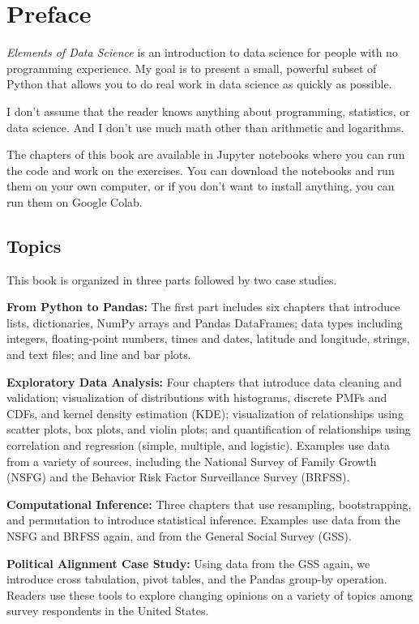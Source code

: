 \hypertarget{preface}{%
\chapter{Preface}\label{preface}}

\emph{Elements of Data Science} is an introduction to data science for
people with no programming experience. My goal is to present a small,
powerful subset of Python that allows you to do real work in data
science as quickly as possible.

I don't assume that the reader knows anything about programming,
statistics, or data science. And I don't use much math other than
arithmetic and logarithms.

The chapters of this book are available in Jupyter notebooks where you
can run the code and work on the exercises. You can download the
notebooks and run them on your own computer, or if you don't want to
install anything, you can run them on Google Colab.

\hypertarget{topics}{%
\section{Topics}\label{topics}}

This book is organized in three parts followed by two case studies.

\textbf{From Python to Pandas:} The first part includes six chapters
that introduce lists, dictionaries, NumPy arrays and Pandas DataFrames;
data types including integers, floating-point numbers, times and dates,
latitude and longitude, strings, and text files; and line and bar plots.

\textbf{Exploratory Data Analysis:} Four chapters that introduce data
cleaning and validation; visualization of distributions with histograms,
discrete PMFs and CDFs, and kernel density estimation (KDE);
visualization of relationships using scatter plots, box plots, and
violin plots; and quantification of relationships using correlation and
regression (simple, multiple, and logistic). Examples use data from a
variety of sources, including the National Survey of Family Growth
(NSFG) and the Behavior Risk Factor Surveillance Survey (BRFSS).

\textbf{Computational Inference:} Three chapters that use resampling,
bootstrapping, and permutation to introduce statistical inference.
Examples use data from the NSFG and BRFSS again, and from the General
Social Survey (GSS).

\textbf{Political Alignment Case Study:} Using data from the GSS again,
we introduce cross tabulation, pivot tables, and the Pandas group-by
operation. Readers use these tools to explore changing opinions on a
variety of topics among survey respondents in the United States.

